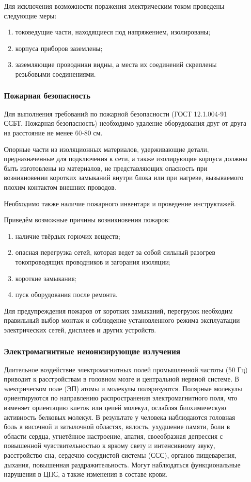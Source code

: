 Для исключения возможности поражения электрическим током проведены следующие меры:

\begin{enumerate}
\item токоведущие части, находящиеся под напряжением, изолированы;
\item корпуса приборов заземлены;
\item заземляющие проводники видны, а места их соединений скреплены резьбовыми соединениями.
\end{enumerate}
\subsubsection{Пожарная безопасность}

Для выполнения требований по пожарной безопасности (ГОСТ 12.1.004-91 ССБТ. Пожарная безопасность)\cite{OT4} необходимо удаление оборудования друг от друга на расстояние не менее 60-80 см.

Опорные части из изоляционных материалов, удерживающие детали, предназначенные для подключения к сети, а также изолирующие корпуса должны быть изготовлены из материалов, не представляющих опасность при возникновении коротких замыканий внутри блока или при нагреве, вызываемого плохим контактом внешних проводов.

Необходимо также наличие пожарного инвентаря и проведение инструктажей.

Приведём возможные причины возникновения пожаров:
\begin{enumerate}
\item наличие твёрдых горючих веществ;
\item опасная перегрузка сетей, которая ведет за собой сильный разогрев токопроводящих проводников и загорания изоляции;
\item короткие замыкания;
\item пуск оборудования после ремонта.
\end{enumerate}
Для предупреждения пожаров от коротких замыканий, перегрузок необходим правильный выбор монтаж и соблюдение установленного режима эксплуатации электрических сетей, дисплеев и других устройств.
\subsubsection{Электромагнитные неионизирующие излучения}

Длительное воздействие электромагнитных полей промышленной частоты (50 Гц) приводит к расстройствам в головном мозге и центральной нервной системе. В электрическом поле (ЭП) атомы и молекулы поляризуются.
Полярные молекулы ориентируются по направлению распространения электромагнитного поля, что изменяет ориентацию клеток или цепей молекул, ослабляя биохимическую активность белковых молекул.
В результате у человека наблюдаются головная боль в височной и затылочной областях, вялость, ухудшение памяти, боли в области сердца, угнетённое настроение, апатия, своеобразная депрессия с повышенной чувствительностью к яркому свету и интенсивному звуку, расстройство сна, сердечно-сосудистой системы (ССС), органов пищеварения, дыхания, повышенная раздражительность.
Могут наблюдаться функциональные нарушения в ЦНС, а также изменения в составе крови.

